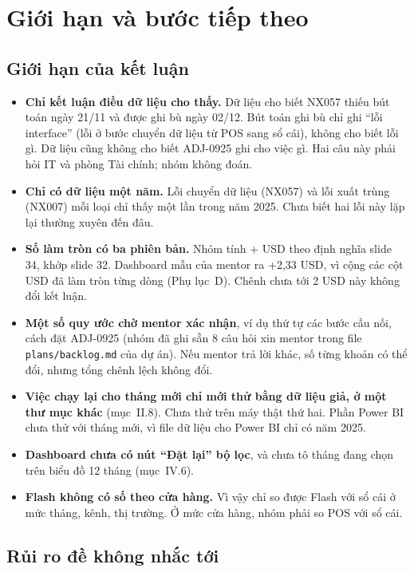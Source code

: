 \section{Giới hạn và bước tiếp theo}

\subsection{Giới hạn của kết luận}

\begin{itemize}
  \item \textbf{Chỉ kết luận điều dữ liệu cho thấy.} Dữ liệu cho biết NX057 thiếu bút toán ngày 21/11 và được ghi bù ngày 02/12. Bút toán ghi bù chỉ ghi ``lỗi interface'' (lỗi ở bước chuyển dữ liệu từ POS sang sổ cái), không cho biết lỗi gì. Dữ liệu cũng không cho biết ADJ-0925 ghi cho việc gì. Hai câu này phải hỏi IT và phòng Tài chính; nhóm không đoán.
  \item \textbf{Chỉ có dữ liệu một năm.} Lỗi chuyển dữ liệu (NX057) và lỗi xuất trùng (NX007) mỗi loại chỉ thấy một lần trong năm 2025. Chưa biết hai lỗi này lặp lại thường xuyên đến đâu.
  \item \textbf{Số làm tròn có ba phiên bản.} Nhóm tính +\SoLamTron{} USD theo định nghĩa slide 34, khớp slide 32. Dashboard mẫu của mentor ra +2,33 USD, vì cộng các cột USD đã làm tròn từng dòng (Phụ lục~D). Chênh chưa tới 2 USD này không đổi kết luận.
  \item \textbf{Một số quy ước chờ mentor xác nhận}, ví dụ thứ tự các bước cầu nối, cách đặt ADJ-0925 (nhóm đã ghi sẵn 8 câu hỏi xin mentor trong file \texttt{plans/backlog.md} của dự án). Nếu mentor trả lời khác, số từng khoản có thể đổi, nhưng tổng chênh lệch không đổi.
  \item \textbf{Việc chạy lại cho tháng mới chỉ mới thử bằng dữ liệu giả, ở một thư mục khác} (mục~II.8). Chưa thử trên máy thật thứ hai. Phần Power BI chưa thử với tháng mới, vì file dữ liệu cho Power BI chỉ có năm 2025.
  \item \textbf{Dashboard chưa có nút ``Đặt lại'' bộ lọc}, và chưa tô tháng đang chọn trên biểu đồ 12 tháng (mục~IV.6).
  \item \textbf{Flash không có số theo cửa hàng.} Vì vậy chỉ so được Flash với sổ cái ở mức tháng, kênh, thị trường. Ở mức cửa hàng, nhóm phải so POS với sổ cái.
\end{itemize}

\subsection{Rủi ro đề không nhắc tới}

